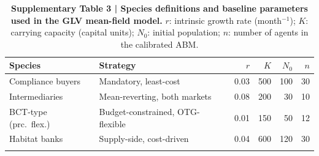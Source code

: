 \documentclass[pdflatex,sn-nature,oneside]{sn-jnl}
\begin{document}
\begin{table}[h]
\caption{%
  \textbf{Supplementary Table 3 | Species definitions and baseline parameters
  used in the GLV mean-field model.}
  $r$: intrinsic growth rate (month$^{-1}$); $K$: carrying capacity (capital units);
  $N_0$: initial population; $n$: number of agents in the calibrated ABM.
}\label{tab:supp_species}
\begin{tabular}{@{}llrrrr@{}}
\toprule
Species                & Strategy                            & $r$  & $K$  & $N_0$ & $n$ \\
\midrule
Compliance buyers      & Mandatory, least-cost               & 0.03 & 500  & 100   & 30 \\
Intermediaries         & Mean-reverting, both markets         & 0.08 & 200  & 30    & 10 \\
BCT-type (prc.\ flex.) & Budget-constrained, OTG-flexible    & 0.01 & 150  & 50    & 12 \\
Habitat banks          & Supply-side, cost-driven            & 0.04 & 600  & 120   & 30 \\
\botrule
\end{tabular}
\end{table}


\end{document}
